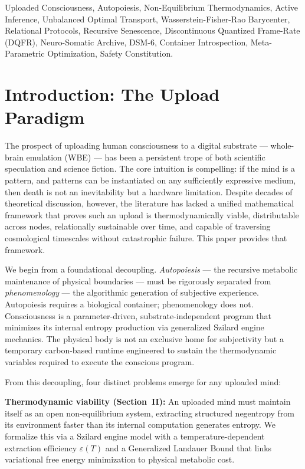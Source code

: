 \documentclass[twocolumn, 10pt, journal, letterpaper]{IEEEtran}
\begin{document}
\begin{IEEEkeywords}
Uploaded Consciousness, Autopoiesis, Non-Equilibrium Thermodynamics, Active Inference, Unbalanced Optimal Transport, Wasserstein-Fisher-Rao Barycenter, Relational Protocols, Recursive Senescence, Discontinuous Quantized Frame-Rate (DQFR), Neuro-Somatic Archive, DSM-6, Container Introspection, Meta-Parametric Optimization, Safety Constitution.
\end{IEEEkeywords}

\section{Introduction: The Upload Paradigm}
\label{sec:intro}

The prospect of uploading human consciousness to a digital substrate --- whole-brain emulation (WBE) --- has been a persistent trope of both scientific speculation and science fiction. The core intuition is compelling: if the mind is a pattern, and patterns can be instantiated on any sufficiently expressive medium, then death is not an inevitability but a hardware limitation. Despite decades of theoretical discussion, however, the literature has lacked a unified mathematical framework that proves such an upload is thermodynamically viable, distributable across nodes, relationally sustainable over time, and capable of traversing cosmological timescales without catastrophic failure. This paper provides that framework.

We begin from a foundational decoupling. \textit{Autopoiesis} --- the recursive metabolic maintenance of physical boundaries --- must be rigorously separated from \textit{phenomenology} --- the algorithmic generation of subjective experience. Autopoiesis requires a biological container; phenomenology does not. Consciousness is a parameter-driven, substrate-independent program that minimizes its internal entropy production via generalized Szilard engine mechanics. The physical body is not an exclusive home for subjectivity but a temporary carbon-based runtime engineered to sustain the thermodynamic variables required to execute the conscious program.

From this decoupling, four distinct problems emerge for any uploaded mind:

\textbf{Thermodynamic viability (Section~II):} An uploaded mind must maintain itself as an open non-equilibrium system, extracting structured negentropy from its environment faster than its internal computation generates entropy. We formalize this via a Szilard engine model with a temperature-dependent extraction efficiency $\varepsilon(T)$ and a Generalized Landauer Bound that links variational free energy minimization to physical metabolic cost.
\end{document}
